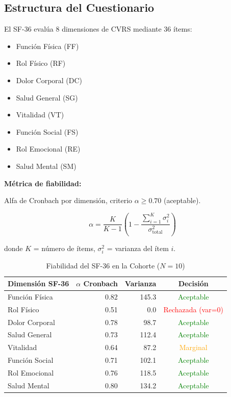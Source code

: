 \documentclass[12pt,letterpaper,twoside]{report}
\begin{document}
\subsection{Estructura del Cuestionario}

El SF-36 evalúa 8 dimensiones de CVRS mediante 36 ítems:
\begin{itemize}[noitemsep]
    \item Función Física (FF)
    \item Rol Físico (RF)
    \item Dolor Corporal (DC)
    \item Salud General (SG)
    \item Vitalidad (VT)
    \item Función Social (FS)
    \item Rol Emocional (RE)
    \item Salud Mental (SM)
\end{itemize}

\begin{estadisticobox}
\textbf{Métrica de fiabilidad:}

Alfa de Cronbach por dimensión, criterio $\alpha \geq 0.70$ (aceptable).

\begin{equation}
\alpha = \frac{K}{K-1} \left( 1 - \frac{\sum_{i=1}^{K} \sigma^2_i}{\sigma^2_{\text{total}}} \right)
\end{equation}

donde $K$ = número de ítems, $\sigma^2_i$ = varianza del ítem $i$.
\end{estadisticobox}

\begin{table}[H]
\centering
\caption{Fiabilidad del SF-36 en la Cohorte ($N=10$)}
\label{tab:sf36_reliability}
\begin{tabular}{@{}lrrc@{}}
\toprule
\textbf{Dimensión SF-36} & \textbf{$\alpha$ Cronbach} & \textbf{Varianza} & \textbf{Decisión} \\
\midrule
Función Física    & 0.82 & 145.3 & \textcolor{green}{Aceptable} \\
Rol Físico        & 0.51 & 0.0   & \textcolor{red}{Rechazada (var=0)} \\
Dolor Corporal    & 0.78 & 98.7  & \textcolor{green}{Aceptable} \\
Salud General     & 0.73 & 112.4 & \textcolor{green}{Aceptable} \\
Vitalidad         & 0.64 & 87.2  & \textcolor{orange}{Marginal} \\
Función Social    & 0.71 & 102.1 & \textcolor{green}{Aceptable} \\
Rol Emocional     & 0.76 & 118.5 & \textcolor{green}{Aceptable} \\
Salud Mental      & 0.80 & 134.2 & \textcolor{green}{Aceptable} \\
\bottomrule
\end{tabular}
\end{table}
\end{document}
